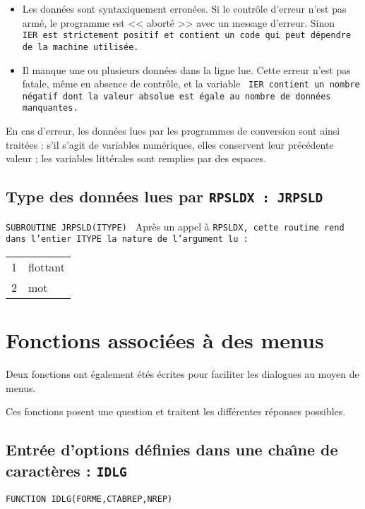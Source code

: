 \documentclass[a4paper,12pt,titlepage]{article}
\newcommand{\fsub}[1]{\hbox {\tt SUBROUTINE #1  } \medskip }
\newcommand{\ffun}[1]{\hbox {\tt FUNCTION   #1  } \medskip }
\begin{document}
  \begin{itemize}
      \item Les donn\'ees sont syntaxiquement erron\'ees. Si le contr\^ole
d'erreur n'est pas arm\'e, le programme est << abort\'e >> avec un message
d'erreur. Sinon \tt IER\rm\ est strictement positif et contient un code qui
peut d\'ependre de la machine utilis\'ee.

      \item Il manque une ou plusieurs donn\'ees dans la ligne lue. Cette
erreur n'est pas fatale, m\^eme en absence de contr\^ole, et la variable \tt
IER\rm\ contient un nombre n\'egatif dont la valeur absolue est \'egale au
nombre de donn\'ees manquantes.
   \end{itemize}

   En cas d'erreur, les donn\'ees lues par les programmes de conversion sont
ainsi trait\'ees : s'il s'agit de variables num\'eriques, elles conservent
leur pr\'ec\'edente valeur ; les variables litt\'erales sont remplies par
des espaces.

\subsection{Type des donn\'ees lues par \tt RPSLDX\rm\ : \tt JRPSLD}
\fsub{JRPSLD(ITYPE)}
                    Apr\`es un appel \`a \tt RPSLDX\rm, cette
		   routine rend dans l'entier \tt ITYPE\rm\ la nature de
		   l'argument lu :

                   \begin{center}\begin{tabular}{ll} 
                        1 &    flottant\\
                        2 &    mot
                   \end{tabular}\end{center}

\section{Fonctions associ\'ees \`a des menus}

    Deux fonctions ont \'egalement \'et\'es \'ecrites pour faciliter les
dialogues au moyen de menus.

Ces fonctions posent une question et traitent les diff\'erentes r\'eponses
possibles.

\subsection{Entr\'ee d'options d\'efinies dans une cha\^{\i}ne de
             caract\`eres : \tt IDLG}
\ffun{IDLG(FORME,CTABREP,NREP)} 
\end{document}
